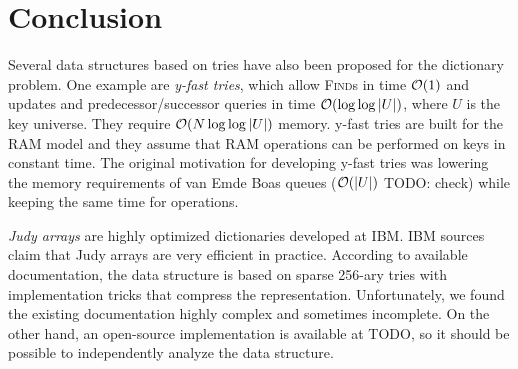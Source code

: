 \chapter*{Conclusion}

Several data structures based on tries have also been proposed for the
dictionary problem. One example are \emph{y-fast tries}, which allow
\textsc{Find}s in time $\mathcal{O}(1)$ and updates and predecessor/successor queries
in time $\mathcal{O}(\log\log |U|)$, where $U$ is the key universe. They require
$\mathcal{O}(N \log\log |U|)$ memory.
y-fast tries are built for the RAM model and they assume that RAM operations
can be performed on keys in constant time.
The original motivation for developing y-fast tries was lowering the memory
requirements of van Emde Boas queues ($\mathcal{O}(|U|)$ TODO: check) while keeping
the same time for operations.

\emph{Judy arrays} are highly optimized dictionaries developed at IBM.
IBM sources claim that Judy arrays are very efficient in practice.
According to available documentation, the data structure is based on
sparse 256-ary tries with implementation tricks that compress
the representation.
Unfortunately, we found the existing documentation highly complex and sometimes
incomplete. On the other hand, an open-source implementation is available
at TODO, so it should be possible to independently analyze the data structure.


